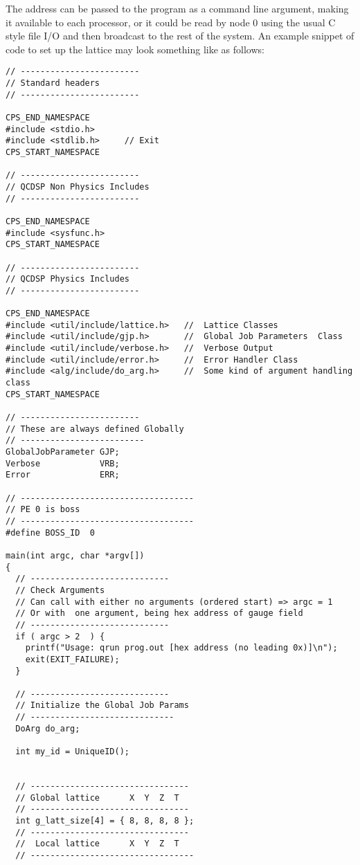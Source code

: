 The address can be passed to the program as a command line argument, 
making it available to each processor, or it could be read by node 0
using the usual C style file I/O and then broadcast to the rest of the
system. An example snippet of code to set up the lattice may look something
like as follows:
{\scriptsize
\begin{verbatim}
// ------------------------ 
// Standard headers
// ------------------------

CPS_END_NAMESPACE
#include <stdio.h>
#include <stdlib.h>     // Exit
CPS_START_NAMESPACE

// ------------------------
// QCDSP Non Physics Includes
// ------------------------

CPS_END_NAMESPACE
#include <sysfunc.h>
CPS_START_NAMESPACE

// ------------------------
// QCDSP Physics Includes
// ------------------------

CPS_END_NAMESPACE
#include <util/include/lattice.h>   //  Lattice Classes
#include <util/include/gjp.h>       //  Global Job Parameters  Class
#include <util/include/verbose.h>   //  Verbose Output 
#include <util/include/error.h>     //  Error Handler Class
#include <alg/include/do_arg.h>     //  Some kind of argument handling class
CPS_START_NAMESPACE

// ------------------------
// These are always defined Globally
// -------------------------
GlobalJobParameter GJP;
Verbose            VRB;
Error              ERR;

// -----------------------------------
// PE 0 is boss
// -----------------------------------
#define BOSS_ID  0

main(int argc, char *argv[]) 
{
  // ----------------------------
  // Check Arguments 
  // Can call with either no arguments (ordered start) => argc = 1
  // Or with  one argument, being hex address of gauge field 
  // ----------------------------
  if ( argc > 2  ) {
    printf("Usage: qrun prog.out [hex address (no leading 0x)]\n");
    exit(EXIT_FAILURE);
  }

  // ----------------------------
  // Initialize the Global Job Params
  // -----------------------------
  DoArg do_arg;

  int my_id = UniqueID();


  // --------------------------------
  // Global lattice      X  Y  Z  T 
  // --------------------------------
  int g_latt_size[4] = { 8, 8, 8, 8 };
  // --------------------------------
  //  Local lattice      X  Y  Z  T 
  // ---------------------------------


\end{verbatim}}
